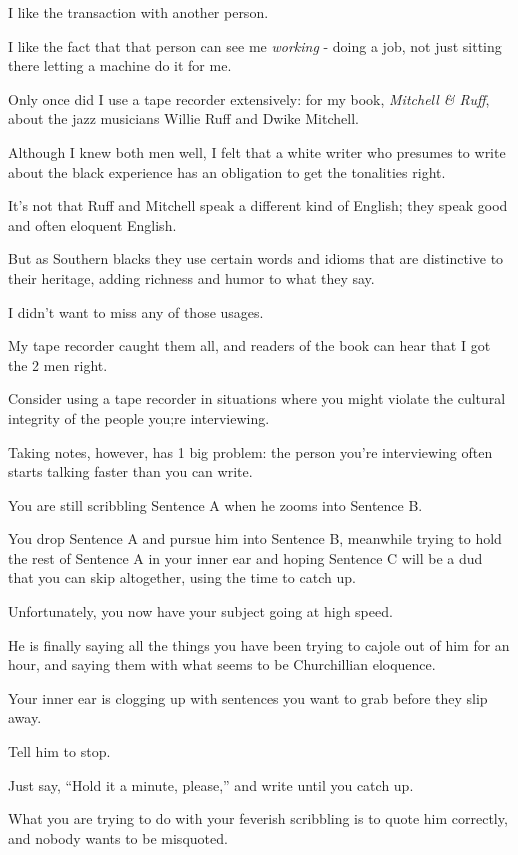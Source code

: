 \documentclass{book}
\numberwithin{equation}{section}
\begin{document}
I like the transaction with another person.

I like the fact that that person can see me \textit{working} - doing a job, not just sitting there letting a machine do it for me.

Only once did I use a tape recorder extensively: for my book, \textit{Mitchell \& Ruff}, about the jazz musicians Willie Ruff and Dwike Mitchell.

Although I knew both men well, I felt that a white writer who presumes to write about the black experience has an obligation to get the tonalities right.

It's not that Ruff and Mitchell speak a different kind of English; they speak good and often eloquent English.

But as Southern blacks they use certain words and idioms that are distinctive to their heritage, adding richness and humor to what they say.

I didn't want to miss any of those usages.

My tape recorder caught them all, and readers of the book can hear that I got the 2 men right.

Consider using a tape recorder in situations where you might violate the cultural integrity of the people you;re interviewing.

%
Taking notes, however, has 1 big problem: the person you're interviewing often starts talking faster than you can write.

You are still scribbling Sentence A when he zooms into Sentence B.

You drop Sentence A and pursue him into Sentence B, meanwhile trying to hold the rest of Sentence A in your inner ear and hoping Sentence C will be a dud that you can skip altogether, using the time to catch up.

Unfortunately, you now have your subject going at high speed.

He is finally saying all the things you have been trying to cajole out of him for an hour, and saying them with what seems to be Churchillian eloquence.

Your inner ear is clogging up with sentences you want to grab before they slip away.

%
Tell him to stop.

Just say, ``Hold it a minute, please,'' and write until you catch up.

What you are trying to do with your feverish scribbling is to quote him correctly, and nobody wants to be misquoted.
\end{document}
